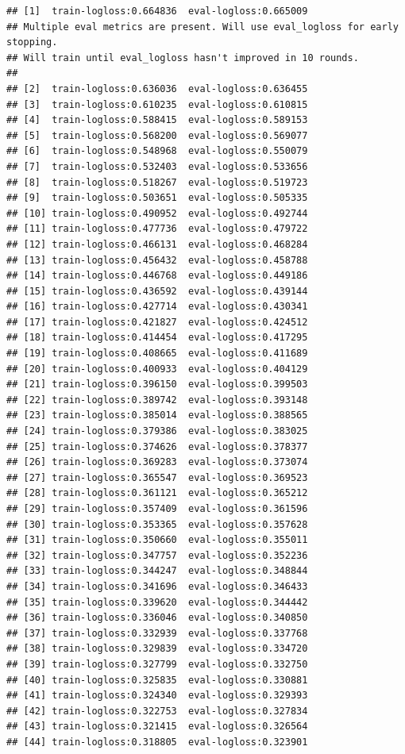 \documentclass[
]{article}
\begin{document}
\begin{verbatim}
## [1]  train-logloss:0.664836  eval-logloss:0.665009 
## Multiple eval metrics are present. Will use eval_logloss for early stopping.
## Will train until eval_logloss hasn't improved in 10 rounds.
## 
## [2]  train-logloss:0.636036  eval-logloss:0.636455 
## [3]  train-logloss:0.610235  eval-logloss:0.610815 
## [4]  train-logloss:0.588415  eval-logloss:0.589153 
## [5]  train-logloss:0.568200  eval-logloss:0.569077 
## [6]  train-logloss:0.548968  eval-logloss:0.550079 
## [7]  train-logloss:0.532403  eval-logloss:0.533656 
## [8]  train-logloss:0.518267  eval-logloss:0.519723 
## [9]  train-logloss:0.503651  eval-logloss:0.505335 
## [10] train-logloss:0.490952  eval-logloss:0.492744 
## [11] train-logloss:0.477736  eval-logloss:0.479722 
## [12] train-logloss:0.466131  eval-logloss:0.468284 
## [13] train-logloss:0.456432  eval-logloss:0.458788 
## [14] train-logloss:0.446768  eval-logloss:0.449186 
## [15] train-logloss:0.436592  eval-logloss:0.439144 
## [16] train-logloss:0.427714  eval-logloss:0.430341 
## [17] train-logloss:0.421827  eval-logloss:0.424512 
## [18] train-logloss:0.414454  eval-logloss:0.417295 
## [19] train-logloss:0.408665  eval-logloss:0.411689 
## [20] train-logloss:0.400933  eval-logloss:0.404129 
## [21] train-logloss:0.396150  eval-logloss:0.399503 
## [22] train-logloss:0.389742  eval-logloss:0.393148 
## [23] train-logloss:0.385014  eval-logloss:0.388565 
## [24] train-logloss:0.379386  eval-logloss:0.383025 
## [25] train-logloss:0.374626  eval-logloss:0.378377 
## [26] train-logloss:0.369283  eval-logloss:0.373074 
## [27] train-logloss:0.365547  eval-logloss:0.369523 
## [28] train-logloss:0.361121  eval-logloss:0.365212 
## [29] train-logloss:0.357409  eval-logloss:0.361596 
## [30] train-logloss:0.353365  eval-logloss:0.357628 
## [31] train-logloss:0.350660  eval-logloss:0.355011 
## [32] train-logloss:0.347757  eval-logloss:0.352236 
## [33] train-logloss:0.344247  eval-logloss:0.348844 
## [34] train-logloss:0.341696  eval-logloss:0.346433 
## [35] train-logloss:0.339620  eval-logloss:0.344442 
## [36] train-logloss:0.336046  eval-logloss:0.340850 
## [37] train-logloss:0.332939  eval-logloss:0.337768 
## [38] train-logloss:0.329839  eval-logloss:0.334720 
## [39] train-logloss:0.327799  eval-logloss:0.332750 
## [40] train-logloss:0.325835  eval-logloss:0.330881 
## [41] train-logloss:0.324340  eval-logloss:0.329393 
## [42] train-logloss:0.322753  eval-logloss:0.327834 
## [43] train-logloss:0.321415  eval-logloss:0.326564 
## [44] train-logloss:0.318805  eval-logloss:0.323901 

\end{verbatim}
\end{document}
